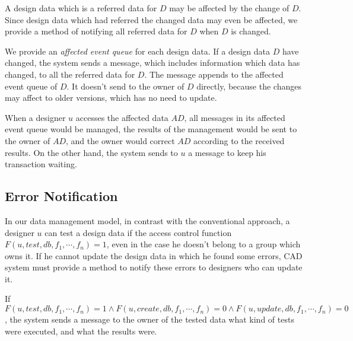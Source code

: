 A design data which is a referred data for $D$ may be affected by the
change of $D$.
Since design data which had referred the changed data may even be affected,
we provide a method of notifying all referred data for
$D$ when $D$ is changed. 

%
We provide an {\em affected event queue} for each design data.
If a design data $D$ have changed, the system sends a message, which
includes information which data has changed, to all the referred data 
for $D$.
The message appends to the affected event queue of $D$.
It doesn't send to the owner of $D$ directly, because the changes may affect 
to older versions, which has no need to update.

When a designer $u$ accesses the affected data $AD$, all messages in its affected
event queue would be managed, the results of the management would
be sent to the owner of $AD$, and the owner would correct $AD$ 
according to the received results.
On the other hand, the system sends to $u$ a message to keep his transaction
waiting.

\subsection{Error Notification}
 \label{subsec:errornot}
In our data management model, in contrast with the conventional
approach, a designer $u$ can test a design data if the access control
function $F(u, test, db, f_1, \cdots, f_n) = 1$, even in the case he
doesn't belong to a group which owns it.
If he cannot update the design data in which he found some errors, CAD
system must provide a method to notify these errors to designers who can
update it.

If $F(u, test, db, f_1, \cdots, f_n) = 1 \wedge F(u, create, db, f_1,
\cdots, f_n) = 0 \wedge F(u, update, db, f_1, \cdots, f_n) = 0$, the 
system sends a message to the owner of the tested data what kind of 
tests were executed, and what the results were. 
